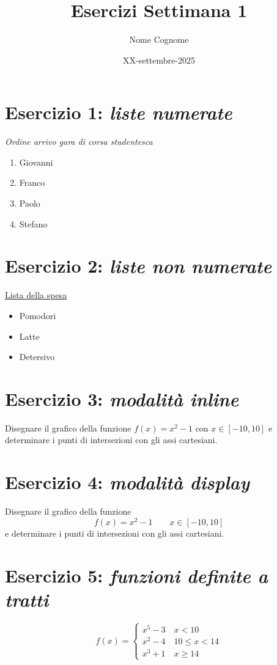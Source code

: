 \documentclass[a4paper,11pt]{article}
\title{Esercizi Settimana 1}
\author{Nome Cognome}
\date{XX-settembre-2025}
\begin{document}
    \maketitle

    \section*{Esercizio 1: \textit{liste numerate}}
    \textit{Ordine arrivo gara di corsa studentesca}
    \begin{enumerate}
        \item Giovanni
        \item Franco
        \item Paolo
        \item Stefano
    \end{enumerate}

    \section*{Esercizio 2: \textit{liste non numerate}}
    \underline{Lista della spesa}
    \begin{itemize}
        \item Pomodori
        \item Latte
        \item Detersivo
    \end{itemize}

    \section*{Esercizio 3: \textit{modalità inline}}
    Disegnare il grafico della funzione $f(x)=x^2-1$ con $x\in[-10, 10]$ e determinare i punti di intersezioni con gli assi cartesiani.

    \section*{Esercizio 4: \textit{modalità display}}
    Disegnare il grafico della funzione 
    \[
    f(x)=x^2-1
    \qquad x\in[-10, 10]
    \]
    e determinare i punti di intersezioni con gli assi cartesiani.

    \section*{Esercizio 5: \textit{funzioni definite a tratti}}
    \[
    f(x) =
    \begin{cases}
        x^5-3 \quad x<10 \\
        x^2-4 \quad 10\le x < 14 \\
        x^3+1 \quad x\ge14
    \end{cases}
    \]
\end{document}
